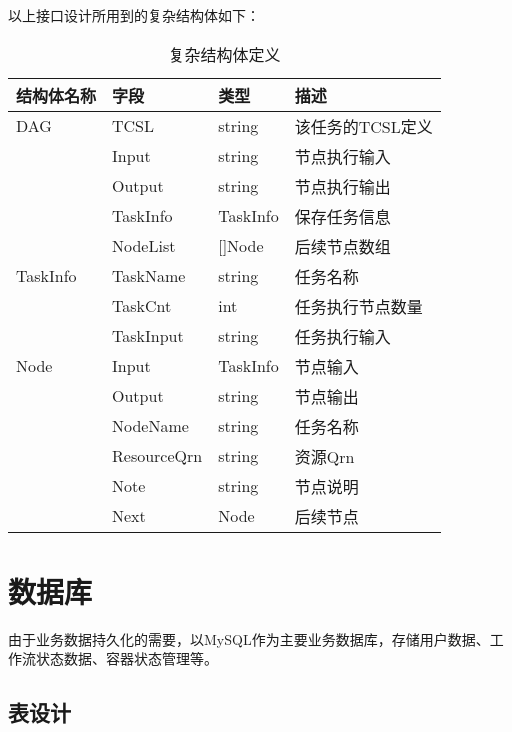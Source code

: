 以上接口设计所用到的复杂结构体如下：
    \begin{table}[H]
        \centering
        \caption{复杂结构体定义}
        \label{tab:design-interface-struct-definition}
        \begin{tabular}{llll}
            \toprule
            结构体名称& 字段 & 类型 & 描述 \\
            \midrule
            DAG & TCSL & string & 该任务的TCSL定义 \\
                & Input & string & 节点执行输入 \\
                & Output & string & 节点执行输出 \\
                & TaskInfo & TaskInfo & 保存任务信息 \\
                & NodeList & []Node & 后续节点数组 \\ \hline
            TaskInfo    & TaskName & string & 任务名称 \\
                        & TaskCnt & int & 任务执行节点数量 \\
                        & TaskInput & string & 任务执行输入 \\ \hline
            Node    & Input & TaskInfo & 节点输入 \\
                    & Output & string & 节点输出 \\
                    & NodeName & string & 任务名称 \\
                    & ResourceQrn & string & 资源Qrn \\
                    & Note & string & 节点说明 \\
                    & Next & Node & 后续节点 \\

            \bottomrule
        \end{tabular}
    \end{table}


\section{数据库}
由于业务数据持久化的需要，以MySQL作为主要业务数据库，存储用户数据、工作流状态数据、容器状态管理等。

\subsection{表设计}


